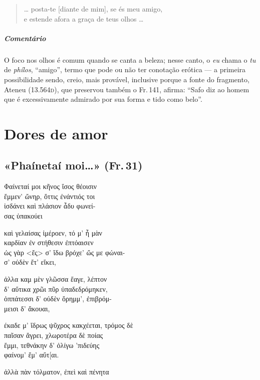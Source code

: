 \begin{verse}
\ldots{} posta-te [diante de mim], se és meu amigo,\\
e estende afora a graça de teus olhos \ldots{}
\end{verse}

\medskip

\paragraph{Comentário} O foco nos olhos é comum quando se canta a beleza; nesse canto, o \emph{eu} chama o
\emph{tu} de \emph{phílos}, ``amigo'', termo que pode ou não ter conotação
erótica --- a primeira possibilidade sendo, creio, mais provável, inclusive
porque a fonte do fragmento, Ateneu (13.564\textsc{d}), que preservou também o Fr.\,141, afirma:
``Safo diz ao homem que é excessivamente admirado por sua forma e tido como belo''.



\chapter{Dores de amor}

\section[«Phaínetaí moi\ldots{}» (Fr.\,31)]{«Phaínetaí moi\ldots{}» (Fr.\,31)}

\begin{gkverse}
Φαίνεταί μοι κῆνος ἴσος θέοισιν\\
ἔμμεν’ ὤνηρ, ὄττις ἐνάντιός τοι\\
ἰσδάνει καὶ πλάσιον ἆδυ φωνεί-\\
σας ὐπακούει

καὶ γελαίσας ἰμέροεν, τό μ’ ἦ μὰν\\
καρδίαν ἐν στήθεσιν ἐπτόαισεν\\
ὠς γὰρ <ἔς> σ’ ἴδω βρόχε’ ὤς με φώναι-\\
σ’ οὐδὲν ἔτ’ εἴκει,

ἀλλα \dagger{}καμ\dagger{} μὲν γλῶσσα \dagger{}ἔαγε\dagger{}, λέπτον\\
δ’ αὔτικα χρῶι πῦρ ὐπαδεδρόμηκεν,\\
ὀππάτεσσι δ’ οὐδὲν ὄρημμ’, ἐπιβρόμ-\\
μεισι δ’ ἄκουαι,

\dagger{}έκαδε\dagger{} μ’ ἴδρως ψῦχρος κακχέεται, τρόμος δὲ\\
παῖσαν ἄγρει, χλωροτέρα δὲ ποίας\\
ἔμμι, τεθνάκην δ’ ὀλίγω ’πιδεύης\\
φαίνομ’ ἔμ’ αὔτ[αι.

ἀλλὰ πὰν τόλματον, ἐπεὶ \dagger{}καὶ πένητα\dagger{}
\end{gkverse}

